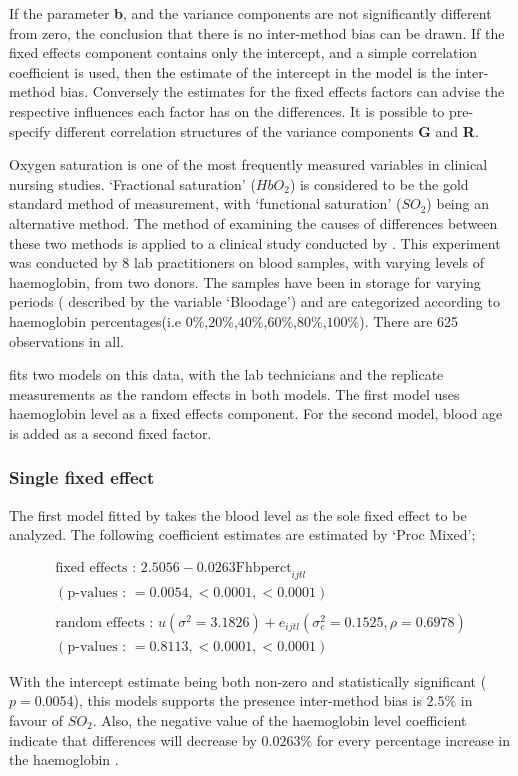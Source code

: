 \documentclass[12pt, a4paper]{report}
\theoremstyle{plain}
\theoremstyle{definition}
\theoremstyle{remark}
\begin{document}
If the parameter \textbf{b}, and the variance components are not
significantly different from zero, the conclusion that there is no
inter-method bias can be drawn. If the fixed effects component
contains only the intercept, and a simple correlation coefficient
is used, then the estimate of the intercept in the model is the
inter-method bias. Conversely the estimates for the fixed effects
factors can advise the respective influences each factor has on
the differences. It is possible to pre-specify different
correlation structures of the variance components \textbf{G} and
\textbf{R}.


Oxygen saturation is one of the most frequently measured variables
in clinical nursing studies. `Fractional saturation' ($HbO_{2}$)
is considered to be the gold standard method of measurement, with
`functional saturation' ($SO_{2}$) being an alternative method.
The method of examining the causes of differences between these
two methods is applied to a clinical study conducted by
\citet{Shiao}. This experiment was conducted by 8 lab
practitioners on blood samples, with varying levels of
haemoglobin, from two donors. The samples have been in storage for
varying periods ( described by the variable `Bloodage') and are
categorized according to haemoglobin percentages(i.e
$0\%$,$20\%$,$40\%$,$60\%$,$80\%$,$100\%$). There are 625
observations in all.

\citet{LaiShiao} fits two models on this data, with the lab
technicians and the replicate measurements as the random effects
in both models. The first model uses haemoglobin level as a fixed
effects component. For the second model, blood age is added as a
second fixed factor.

\subsubsection{Single fixed effect} The first model fitted by \citet{LaiShiao} takes the
blood level as the sole fixed effect to be analyzed. The following
coefficient estimates are estimated by `Proc Mixed';
\begin{framed}\begin{eqnarray}
	\mbox{fixed effects :   } 2.5056 - 0.0263\mbox{Fhbperct}_{ijtl} \\
	(\mbox{p-values :   } = 0.0054, <0.0001, <0.0001)\nonumber\\\nonumber\\
	\mbox{random effects :   } u(\sigma^{2}=3.1826) + e_{ijtl}
	(\sigma^{2}_{e}=0.1525, \rho= 0.6978) \nonumber\\
	(\mbox{p-values :   } = 0.8113, <0.0001, <0.0001)\nonumber
	\end{eqnarray}
\end{framed}
With the intercept estimate being both non-zero and statistically
significant ($p=0.0054$), this models supports the presence
inter-method bias is $2.5\%$ in favour of $SO_{2}$. Also, the
negative value of the haemoglobin level coefficient indicate that
differences will decrease by $0.0263\%$ for every percentage
increase in the haemoglobin .
\end{document}
